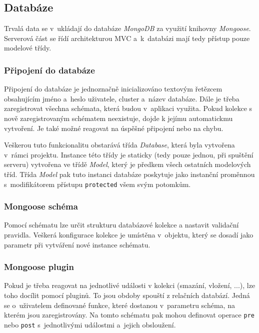 \documentclass[a4paper,12pt]{article}
\def\code#1{\texttt{#1}}
\begin{document}
\subsection{Databáze}

Trvalá data se v~ukládají do databáze \textit{MongoDB} za využití knihovny \textit{Mongoose}. Serverová část se řídí architekturou MVC a~k~databázi mají tedy přístup pouze modelové třídy.

\subsubsection{Připojení do databáze}

Připojení do databáze je jednoznačně inicializováno textovým řetězcem obsahujícím jméno a~heslo uživatele, cluster a~název databáze. Dále je třeba zaregistrovat všechna schémata, která budou v~aplikaci využita. Pokud kolekce s nově zaregistrovaným schématem neexistuje, dojde k jejímu automatickmu vytvoření. Je také možné reagovat na úspěšné připojení nebo na chybu.

Veškerou tuto funkcionalitu obstarává třída \textit{Database}, která byla vytvořena v~rámci projektu. Instance této třídy je staticky (tedy pouze jednou, při spuštění serveru) vytvořena ve třídě \textit{Model}, který je předkem všech ostatních modelových tříd. Třída \textit{Model} pak tuto instanci databáze poskytuje jako instanční proměnnou s~modifikátorem přístupu \code{protected} všem svým potomkům.



\subsubsection{Mongoose schéma}

Pomocí schématu lze určit strukturu databázové kolekce a nastavit validační pravidla. Veškerá konfigurace kolekce je umístěna v~objektu, který se dosadí jako parametr při vytváření nové instance schématu.



\subsubsection{Mongoose plugin}

Pokud je třeba reagovat na jednotlivé události v kolekci (smazání, vložení, ...), lze toho docílit pomocí pluginů. To jsou obdoby spouští z relačních databází. Jedná se o~uživatelem definované funkce, které dostanou v~parametru schéma, na kterém jsou zaregistrovány. Na tomto schématu pak mohou definovat operace \code{pre} nebo \code{post} s~jednotlivými událostmi a~jejich obsloužení.
\end{document}
